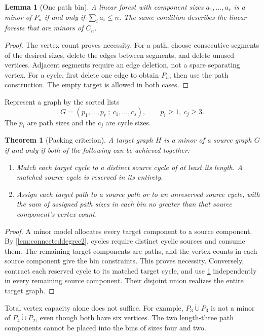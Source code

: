 \documentclass[11pt,letterpaper]{article}
\theoremstyle{plain}
\newtheorem{theorem}{Theorem}[section]
\newtheorem{lemma}[lemma]{Lemma}
\theoremstyle{definition}
\theoremstyle{remark}
\newcommand{\sqgraph}{\mathbin{\dot\cup}}
\begin{document}
\begin{lemma}[One path bin]\label{lem:pathbin}
A linear forest with component sizes $a_1,\ldots,a_r$ is a minor of
$P_n$ if and only if $\sum_i a_i\le n$. The same condition describes
the linear forests that are minors of $C_n$.
\end{lemma}

\begin{proof}
The vertex count proves necessity. For a path, choose consecutive
segments of the desired sizes, delete the edges between segments, and
delete unused vertices. Adjacent segments require an edge deletion,
not a spare separating vertex. For a cycle, first delete one edge to
obtain $P_n$, then use the path construction. The empty target is
allowed in both cases.
\end{proof}

Represent a graph by the sorted lists
\[
 G=(p_1,\ldots,p_r\ ;\ c_1,\ldots,c_s),
 \qquad p_i\ge1,\ c_j\ge3.
\]
The $p_i$ are path sizes and the $c_j$ are cycle sizes.

\begin{theorem}[Packing criterion]\label{thm:packing}
A target graph $H$ is a minor of a source graph $G$ if and only if both
of the following can be achieved together:
\begin{enumerate}[label=(\roman*)]
\item Match each target cycle to a distinct source cycle of at least
      its length. A matched source cycle is reserved in its entirety.
\item Assign each target path to a source path or to an unreserved
      source cycle, with the sum of assigned path sizes in each bin
      no greater than that source component's vertex count.
\end{enumerate}
\end{theorem}

\begin{proof}
A minor model allocates every target component to a source component.
By \cref{lem:connecteddegree2}, cycles require distinct cyclic sources
and consume them. The remaining target components are paths, and the
vertex counts in each source component give the bin constraints.
This proves necessity. Conversely, contract each reserved cycle to
its matched target cycle, and use \cref{lem:pathbin} independently in
every remaining source component. Their disjoint union realizes the
entire target graph.
\end{proof}

Total vertex capacity alone does not suffice. For example,
$P_3\sqgraph P_3$ is not a minor of $P_4\sqgraph P_2$, even though both
have six vertices. The two length-three path components cannot be
placed into the bins of sizes four and two.
\end{document}
